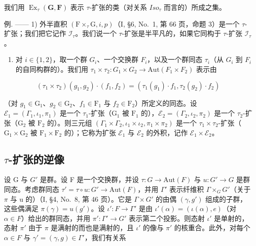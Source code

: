 我们用 \(\operatorname{Ex}_{\tau}(\mathbf{G},\mathbf{F})\) 表示 \(\tau\)-扩张的类（对关系 \(Iso_{\tau}\) 而言的）所成之集。

例. —— 1) 外半直积 \((\mathrm{F} \times_{\tau} \mathrm{G}, i, p)\)（I, §6, No.~1, 第 66 页，命题 3）是一个 \(\tau\)-扩张；我们把它记作 \(\mathcal{I}_{\tau}\)。我们说一个 \(\tau\)-扩张是半平凡的，如果它同构于 \(\tau\)-扩张 \(\mathcal{I}_{\tau}\)。

\begin{enumerate}
\def\labelenumi{\arabic{enumi})}
\setcounter{enumi}{1}
\tightlist
\item
  对 \(i \in \{1,2\}\)，取一个群 \(G_{i}\)、一个交换群 \(F_{i}\)，以及一个群同态 \(\tau_{i}\)（从 \(G_{i}\) 到 \(F_{i}\) 的自同构群的）。我们用 \(\tau_{1} \times \tau_{2}: G_{1} \times G_{2} \to \text{Aut}(F_{1} \times F_{2})\) 表示由
\end{enumerate}

\[
(\tau_ {1} \times \tau_ {2}) (g _ {1}, g _ {2}) \cdot (f _ {1}, f _ {2}) = (\tau_ {1} (g _ {1}) \cdot f _ {1}, \tau_ {2} (g _ {2}) \cdot f _ {2})
\]

（对 \(g_{1} \in \mathrm{G}_{1}\)、\(g_{2} \in \mathrm{G}_{2}\)、\(f_{1} \in \mathrm{F}_{1}\) 与 \(f_{2} \in \mathrm{F}_{2}\)）所定义的同态。设 \(\mathcal{E}_1 = (\Gamma_1, \iota_1, \pi_1)\) 是一个 \(\tau_1\)-扩张（\(\mathrm{G}_1\) 被 \(\mathrm{F}_1\) 的），\(\mathcal{E}_2 = (\Gamma_2, \iota_2, \pi_2)\) 是一个 \(\tau_2\)-扩张（\(\mathrm{G}_2\) 被 \(\mathrm{F}_2\) 的）。则三元组 \((\Gamma_1 \times \Gamma_2, \iota_1 \times \iota_2, \pi_1 \times \pi_2)\) 是一个 \(\tau_1 \times \tau_2\)-扩张（\(\mathrm{G}_1 \times \mathrm{G}_2\) 被 \(\mathrm{F}_1 \times \mathrm{F}_2\) 的）；它称为扩张 \(\mathcal{E}_1\) 与 \(\mathcal{E}_2\) 的外积，记作 \(\mathcal{E}_1 \times \mathcal{E}_2\)。

\subsection{\texorpdfstring{\(\tau\)-扩张的逆像}{\textbackslash tau-扩张的逆像}}

设 G 与 \(G'\) 是群。设 F 是一个交换群，并设 \(\tau: G \to \text{Aut}(F)\) 与 \(u: G' \to G\) 是群同态。考虑群同态 \(\tau' = \tau \circ u: G' \to \text{Aut}(F)\)，并用 \(\Gamma'\) 表示纤维积 \(\Gamma \times_{G} G'\)（关于 \(\pi\) 与 u 的）（I, §4, No.~8, 第 46 页）。它是 \(\Gamma \times G'\) 的由偶 \((\gamma, g')\) 组成的子群，这些偶满足 \(\pi(\gamma) = u(g')\)。设 \(\iota': F \to \Gamma'\) 是由 \(\iota'(\alpha) = (\iota(\alpha), e)\)（对 \(\alpha \in F\)）给出的群同态，并用 \(\pi': \Gamma' \to G'\) 表示第二个投影。则态射 \(\iota'\) 是单射的，态射 \(\pi'\) 由于 \(\pi\) 是满射的而也是满射的，且 \(\iota'\) 的像与 \(\pi'\) 的核重合。此外，对每个 \(\alpha \in F\) 与 \(\gamma' = (\gamma, g) \in \Gamma'\)，我们有关系

